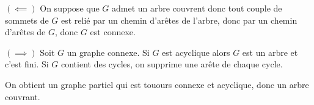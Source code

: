 \begin{myproof}
  $(\impliedby)$ On suppose que $G$ admet un arbre couvrent donc tout couple de sommets de $G$ est relié par un chemin d'arêtes de l'arbre, donc par un chemin d'arêtes de $G$, donc $G$ est connexe. 

  $( \implies)$  Soit $G$   un graphe connexe. Si $G$   est acyclique alors $G$   est un arbre et c'est fini. Si $G$  contient des cycles, on supprime une arête de chaque cycle. 

  On obtient un graphe partiel qui est touours connexe et acyclique, donc un arbre couvrant.
\end{myproof}
